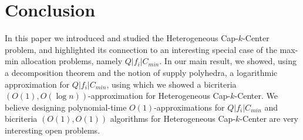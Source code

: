 \documentclass{llncs}
\def\mckc{{{\sffamily Heterogeneous Cap-$k$-Center}}\xspace}
\def\cckp{$Q|f_i|C_{min}$\xspace}
\begin{document}
\section{Conclusion}
In this paper we introduced and studied the \mckc problem, and highlighted its connection to an interesting special case of the max-min allocation problems, namely \cckp. In our main result, we showed, using a decomposition theorem and the notion of supply polyhedra, a logarithmic approximation for \cckp, using which we showed a bicriteria $(O(1),O(\log n))$-approximation for \mckc. We believe designing polynomial-time $O(1)$-approximations for \cckp and bicriteria $(O(1),O(1))$ algorithms for \mckc are very interesting open problems.



%


\newpage
\appendix



%
%
%
%
%
%
%
%
%
%

\end{document}
